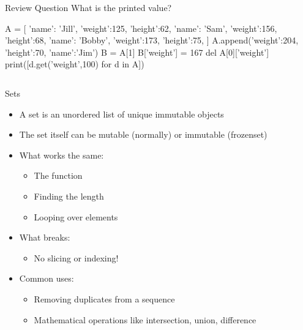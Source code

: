 \documentclass[pdf, aspectratio=169, 12pt]{beamer}
\begin{document}
\begin{frame}[fragile]{Review Question}
	What is the printed value?
		{ \footnotesize
			\begin{pythoncode}[tabsize = 2]
A = [
		{'name': 'Jill',  'weight':125, 'height':62},
		{'name': 'Sam',   'weight':156, 'height':68},
		{'name': 'Bobby', 'weight':173, 'height':75},
 ]
A.append({'weight':204, 'height':70, 'name':'Jim'})
B = A[1]
B['weight'] = 167
del A[0]['weight']
print([d.get('weight',100) for d in A])
		\end{pythoncode}
	}
	\begin{columns}
		\begin{poll}
		\item \pyi{[100,167,173,204]}
		\item \pyi{[100,156,173,204]}
		\end{poll}
		
		\column{0.4\textwidth}
		\begin{poll}
			\setcounter{enumi}{2}
		\item \pyi{[125,167,173,204]}
		\item \pyi{[100,156,173,70]}
		\end{poll}
	\end{columns}
\end{frame}

\begin{frame}{Sets}
	\begin{itemize}
		\item A \alert{set} is an unordered list of unique immutable objects
		\item The set itself can be mutable (normally) or immutable (frozenset)
		\item What works the same:
			\begin{itemize}
				\item The  function
				\item Finding the length
				\item Looping over elements
			\end{itemize}
		\item What breaks:
			\begin{itemize}
				\item No slicing or indexing!
			\end{itemize}
		\item Common uses:
			\begin{itemize}
				\item Removing duplicates from a sequence
				\item Mathematical operations like intersection, union, difference
			\end{itemize}
	\end{itemize}
\end{frame}
\end{document}
